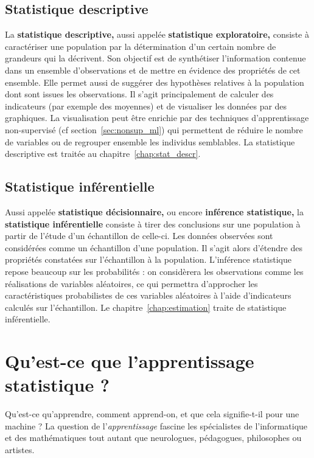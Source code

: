 \subsection{Statistique descriptive} 
La \textbf{statistique descriptive,} aussi appelée \textbf{statistique
  exploratoire,} consiste à caractériser une population par la détermination
d'un certain nombre de grandeurs qui la décrivent. Son objectif est de
synthétiser l'information contenue dans un ensemble d'observations et de mettre
en évidence des propriétés de cet ensemble. Elle permet aussi de suggérer des
hypothèses relatives à la population dont sont issues les observations. Il
s'agit principalement de calculer des indicateurs (par exemple des moyennes) et
de visualiser les données par des graphiques. La visualisation peut être
enrichie par des techniques d'apprentissage non-supervisé (cf
section~\ref{sec:nonsup_ml}) qui permettent de réduire le nombre de variables
ou de regrouper ensemble les individus semblables.  La statistique descriptive
est traitée au chapitre~\ref{chap:stat_descr}.

\subsection{Statistique inférentielle} 
Aussi appelée \textbf{statistique décisionnaire,} ou encore \textbf{inférence
  statistique,} la \textbf{statistique inférentielle} consiste à tirer des
conclusions sur une population à partir de l'étude d'un échantillon de
celle-ci. Les données observées sont considérées comme un échantillon d'une
population. Il s'agit alors d'étendre des propriétés constatées sur
l'échantillon à la population. L'inférence statistique repose beaucoup sur les
probabilités : on considèrera les observations comme les réalisations de
variables aléatoires, ce qui permettra d'approcher les caractéristiques
probabilistes de ces variables aléatoires à l'aide d'indicateurs calculés sur
l'échantillon. Le chapitre~\ref{chap:estimation} traite de statistique
inférentielle.

\section{Qu'est-ce que l'apprentissage statistique ?}
Qu'est-ce qu'apprendre, comment apprend-on, et que cela signifie-t-il pour une
machine ? La question de l'{\it apprentissage} fascine les spécialistes de
l'informatique et des mathématiques tout autant que neurologues, pédagogues,
philosophes ou artistes.


